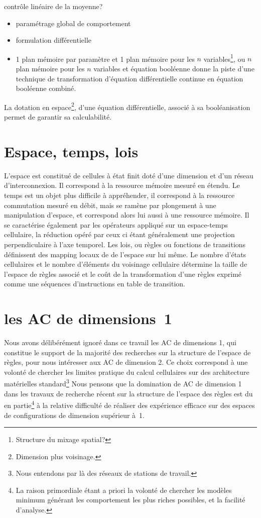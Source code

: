 contr\^ole lin\'eaire de la moyenne?
\begin{itemize}
\item param\'etrage global de comportement
\item formulation diff\'erentielle
\item 1 plan m\'emoire par param\`etre
  et 1 plan m\'emoire pour les $n$ variables\footnote{%
    Structure du mixage spatial?}, ou $n$ plan m\'emoire pour les $n$
  variables et \'equation bool\'eenne donne la piste d'une technique de
  transformation d'\'equation diff\'erentielle continue en \'equation
  bool\'eenne combin\'e.
\end{itemize}
La dotation en espace\footnote{%
  Dimension plus voisinage.}, %
d'une \'equation diff\'erentielle, associ\'e \`a sa bool\'ea\-ni\-sa\-tion permet de
garantir sa calculabilit\'e.

\section{Espace, temps, lois}

L'espace est constitu\'e de cellules \`a \'etat finit dot\'e d'une dimension
et d'un r\'eseau d'interconnexion. %
Il correspond \`a la ressource m\'emoire mesur\'e en \'etendu. %
Le temps est un objet plus difficile \`a appr\'ehender, il correspond \`a
la ressource commutation mesur\'e en d\'ebit, mais se ram\`ene par
plongement \`a une manipulation d'espace, et correspond alors lui aussi
\`a une ressource m\'emoire. %
Il se caract\'erise \'egalement par les op\'erateurs appliqu\'e sur un
espace-temps cellulaire, la r\'eduction op\'er\'e par ceux ci \'etant
g\'en\'eralement une projection perpendiculaire \`a l'axe temporel.
Les lois, ou r\`egles ou fonctions de transitions d\'efinissent des
mapping locaux de de l'espace sur lui m\^eme. %
Le nombre d'\'etats cellulaires et le nombre d'\'el\'ements du voisinage
cellulaire d\'etermine la taille de l'espace de r\`egles associ\'e et le
co\^ut de la transformation d'une r\`egles exprim\'e comme une s\'equences
d'instructions en table de transition.

\section{les AC de dimensions~1}

Nous avons d\'elib\'er\'ement ignor\'e dans ce travail les AC de dimensions 1,
qui constitue le support de la majorit\'e des recherches sur la
structure de l'espace de r\`egles, pour nous int\'eresser aux AC de
dimension 2. %
Ce choix correspond \`a une volont\'e de chercher les limites pratique du
calcul cellulaires sur des architecture mat\'erielles
standard\footnote{%
  Nous entendons par l\`a des r\'eseaux de stations de travail.} %
Nous pensons que la domination de AC de dimension 1 dans les travaux
de recherche r\'ecent sur la structure de l'espace des r\`egles est du en
partie\footnote{%
  La raison primordiale \'etant a priori la volont\'e de chercher les
  mod\`eles minimum g\'en\'erant les comportement les plus riches possibles,
  et la facilit\'e d'analyse.} %
\`a la relative difficult\'e de r\'ealiser des exp\'erience efficace
sur des espaces de configurations de dimension sup\'erieur \`a~1.


